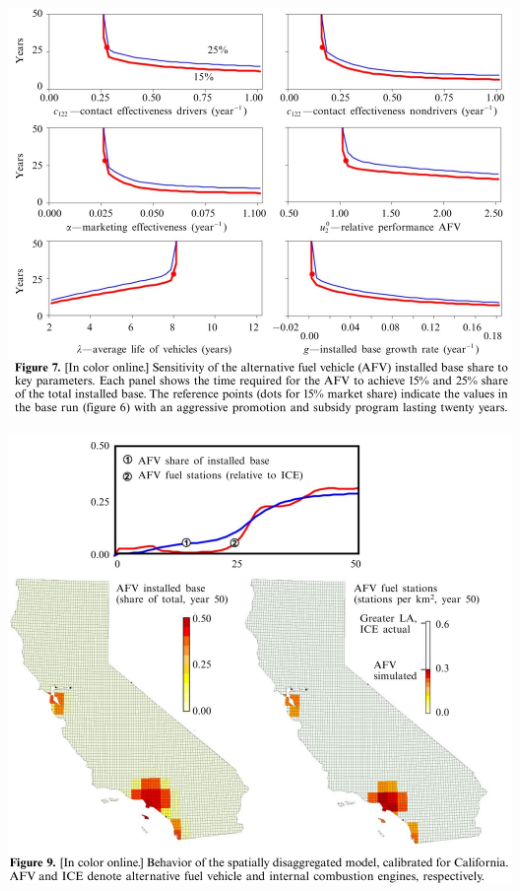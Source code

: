 \documentclass{beamer}
\begin{document}
\begin{frame}
  \includegraphics[height=\textheight]{Sterman-fig-7.jpg}
\end{frame}

\begin{frame}
  \includegraphics[height=\textheight]{Sterman-fig-9.jpg}
\end{frame}
\end{document}

